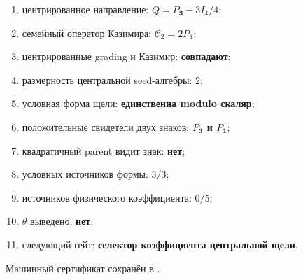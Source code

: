 \begin{protocol}\begin{enumerate}
\item центрированное направление: \textbf{$Q=P_{\mathbf3}-3I_4/4$};
\item семейный оператор Казимира: \textbf{$\mathcal C_2=2P_{\mathbf3}$};
\item центрированные grading и Казимир: \textbf{совпадают};
\item размерность центральной seed-алгебры: \textbf{$2$};
\item условная форма щели: \textbf{единственна modulo скаляр};
\item положительные свидетели двух знаков: \textbf{$P_{\mathbf3}$ и $P_{\mathbf1}$};
\item квадратичный parent видит знак: \textbf{нет};
\item условных источников формы: \textbf{$3/3$};
\item источников физического коэффициента: \textbf{$0/5$};
\item $\theta$ выведено: \textbf{нет};
\item следующий гейт: \textbf{селектор коэффициента центральной щели}.
\end{enumerate}\end{protocol}

Машинный сертификат сохранён в
.